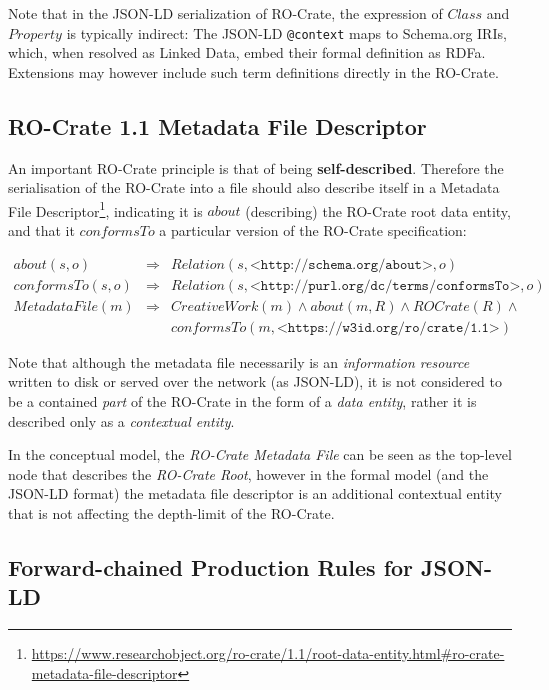 Note that in the JSON-LD serialization of RO-Crate, the expression of $Class$ and $Property$ is typically indirect: The JSON-LD \texttt{@context} maps to Schema.org IRIs, which, when resolved as Linked Data, embed their formal definition as RDFa. Extensions may however include such term definitions directly in the RO-Crate.

\subsection{RO-Crate 1.1 Metadata File Descriptor}

An important RO-Crate principle is that of being \textbf{self-described}. Therefore the serialisation of the RO-Crate into a file should also describe itself in a Metadata File Descriptor\footnote{
    \url{https://www.researchobject.org/ro-crate/1.1/root-data-entity.html\#ro-crate-metadata-file-descriptor}
}, indicating it is $about$ (describing) the RO-Crate root data entity, and that it $conformsTo$ a particular version of the RO-Crate specification:

\small
\begin{eqnarray*}
about(s,o)      & \Rightarrow & Relation(s, \texttt{<http://schema.org/about>}, o)   \\
conformsTo(s,o) & \Rightarrow & Relation(s, \texttt{<http://purl.org/dc/terms/conformsTo>}, o)   \\
MetadataFile(m) & \Rightarrow & CreativeWork(m) \land about(m,R) \land ROCrate(R) \land    \\
                &             & conformsTo(m, \texttt{<https://w3id.org/ro/crate/1.1>})
\end{eqnarray*}
\normalsize

Note that although the metadata file necessarily is an \emph{information resource} written to disk or served over the network (as JSON-LD), it is not considered to be a contained \emph{part} of the RO-Crate in the form of a \emph{data entity}, rather it is described only as a \emph{contextual entity}.

In the conceptual model, the \emph{RO-Crate Metadata File} can be seen as the top-level node that describes the \emph{RO-Crate Root}, however in the formal model (and the JSON-LD format) the metadata file descriptor is an additional contextual entity that is not affecting the depth-limit of the RO-Crate.

\subsection{Forward-chained Production Rules for JSON-LD}

